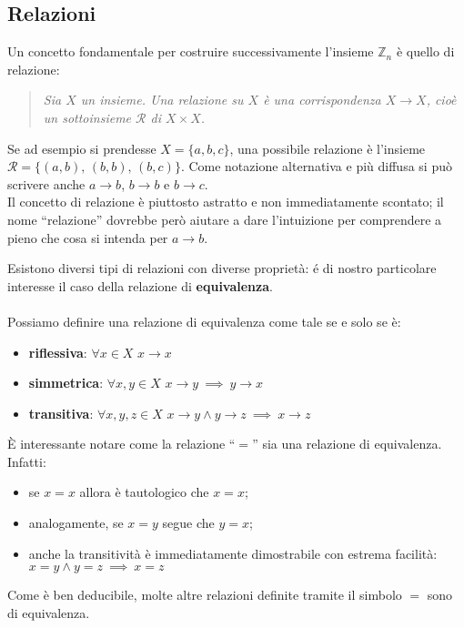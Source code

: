 \subsection{Relazioni}\label{Relazi}
\noindent Un concetto fondamentale per costruire successivamente l'insieme $\mathbb{Z}_n$ è quello di relazione:
\begin{quote}
    \emph{Sia $X$ un insieme. Una relazione su $X$ è una corrispondenza $X\to X$, cioè un sottoinsieme $\mathcal{R}$ di $X\times X$.}
\end{quote}

 \noindent Se ad esempio si prendesse $X=\{a,b,c\}$, una possibile relazione è l'insieme $\mathcal{R}=\{(a,b),\, (b,b),\,(b,c)\}$. Come notazione alternativa e più diffusa si può scrivere anche $a \to b$, $b \to b$ e $b \to c$.\\

\noindent Il concetto di relazione è piuttosto astratto e non immediatamente scontato; il nome ``relazione'' dovrebbe però aiutare a dare l'intuizione per comprendere a pieno che cosa si intenda per $a \to b$.

\noindent Esistono diversi tipi di relazioni con diverse proprietà: \'e di nostro particolare interesse il caso della relazione di \textbf{equivalenza}.\\
\\Possiamo definire una relazione di equivalenza come tale se e solo se è:
\begin{itemize}
\item \textbf{riflessiva}: $\forall x\in X$ $x \to x$
\item \textbf{simmetrica}: $\forall x,y\in X$ $x \to y \ \implies \ y \to x$
\item \textbf{transitiva}: $\forall x,y,z\in X$ $x \to y \land y \to z \ \implies \ x \to z$
\end{itemize}
È interessante notare come la relazione ``$=$'' sia una relazione di equivalenza. Infatti:
\begin{itemize}
    \item se $x=x$ allora è tautologico che $x=x$;
    \item analogamente, se $x=y$ segue che $y=x$;
    \item anche la transitività è immediatamente dimostrabile con estrema facilità: $x=y \land y=z \ \implies \ x = z$
\end{itemize}
Come è ben deducibile, molte altre relazioni definite tramite il simbolo $=$ sono di equivalenza.